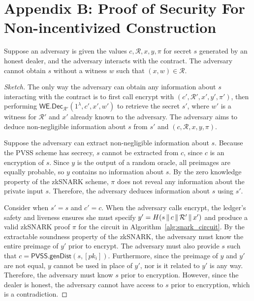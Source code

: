 \section{Appendix B: Proof of Security For Non-incentivized Construction}
\begin{lemma}\label{lemma:non_malleability_appendix}
    Suppose an adversary is given the values $c, \mathcal{R}, x, y, \pi$ for secret $s$ generated by an honest dealer, and the adversary interacts with the contract.
    The adversary cannot obtain $s$ without a witness $w$ such that $(x, w) \in \mathcal{R}$.
\end{lemma}
\begin{proof}[Sketch]
    The only way the adversary can obtain any information about $s$ interacting with the contract is to first call \textsf{encrypt} with $(c', \mathcal{R}', x', y', \pi')$,
    then performing $\textsf{WE.Dec}_{\mathcal{R}'}(1^{\lambda}, c', x', w')$ to retrieve the secret $s'$, where $w'$ is a witness for $\mathcal{R}'$ and $x'$ already known to the adversary.
    The adversary aims to deduce non-negligible information about $s$ from $s'$ and $(c, \mathcal{R}, x, y, \pi)$.

    Suppose the adversary can extract non-negligible information about $s$.
    Because the PVSS scheme has secrecy, $s$ cannot be extracted from $c$, since $c$ is an encryption of $s$.
    Since $y$ is the output of a random oracle, all preimages are equally probable, so $y$ contains no information about $s$.
    By the zero knowledge property of the zkSNARK scheme, $\pi$ does not reveal any information about the private input $s$.
    Therefore, the adversary deduces information about $s$ using $s'$.

    Consider when $s' = s$ and $c' = c$.
    When the adversary calls \textsf{encrypt}, the ledger's safety and liveness ensures she must specify $y' = H(s \,\|\, c \,\|\, \mathcal{R}' \,\|\, x')$ and produce a valid zkSNARK proof $\pi$ for the circuit in Algorithm~\ref{alg:snark_circuit}.
    By the extractable soundness property of the zkSNARK, the adversary must know the entire preimage of $y'$ prior to \textsf{encrypt}.
    The adversary must also provide $s$ such that $c = \textsf{PVSS.genDist}(s, [pk_i])$.
    Furthermore, since the preimage of $y$ and $y'$ are not equal, $y$ cannot be used in place of $y'$, nor is it related to $y'$ is any way.
    Therefore, the adversary must know $s$ prior to encryption.
    However, since the dealer is honest, the adversary cannot have access to $s$ prior to encryption, which is a contradiction.


\end{proof}
